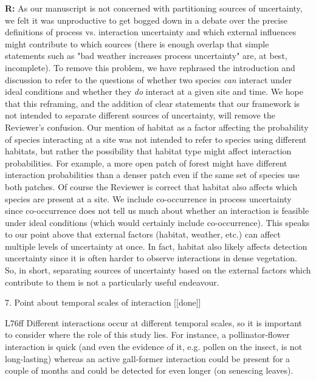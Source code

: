 \documentclass[12pt]{letter}
\newenvironment{refquote}{\bigskip \begin{it}}{\end{it}\smallskip}
\begin{document}
		\textbf{R:} As our manuscript is not concerned with partitioning sources of uncertainty, we felt it was unproductive to get bogged down in a debate over the precise definitions of process vs. interaction uncertainty and which external influences might contribute to which sources (there is enough overlap that simple statements such as "bad weather increases process uncertainty" are, at best, incomplete). To remove this problem, we have rephrased the introduction and discussion to refer to the questions of whether two species \emph{can} interact under ideal conditions and whether they \emph{do} interact at a given site and time. We hope that this reframing, and the addition of clear statements that our framework is not intended to separate different sources of uncertainty, will remove the Reviewer's confusion.
		\smallskip
		Our mention of habitat as a factor affecting the probability of species interacting at a site was not intended to refer to species using different habitats, but rather the possibility that habitat type might affect interaction probabilities. For example, a more open patch of forest might have different interaction probabilities than a denser patch even if the same set of species use both patches. Of course the Reviewer is correct that habitat also affects which species are present at a site. We include co-occurrence in process uncertainty since co-occurrence does not tell us much about whether an interaction is feasible under ideal conditions (which would certainly include co-occurrence). This speaks to our point above that external factors (habitat, weather, etc.) can affect multiple levels of uncertainty at once. In fact, habitat also likely affects detection uncertainty since it is often harder to observe interactions in dense vegetation. So, in short, separating sources of uncertainty based on the external factors which contribute to them is not a particularly useful endeavour.


	7. Point about temporal scales of interaction [[done]]

		\begin{refquote}
		L76ff Different interactions occur at different temporal scales, so it is important to consider where the role of this study lies. For instance, a pollinator-flower interaction is quick (and even the evidence of it, e.g. pollen on the insect, is not long-lasting) whereas an active gall-former interaction could be present for a couple of months and could be detected for even longer (on senescing leaves).
		\end{refquote}
\end{document}
